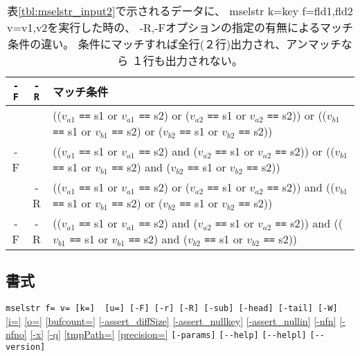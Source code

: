 \begin{table}[htbp]
\begin{center}
\caption{表\ref{tbl:mselstr_input2}で示されるデータに、
mselstr k=key f=fld1,fld2 v=v1,v2を実行した時の、
-R,-Fオプションの指定の有無によるマッチ条件の違い。
条件にマッチすれば全行(２行)出力され、アンマッチなら
１行も出力されない。\label{tbl:mselstr_cond}}
{\footnotesize
\begin{tabular}{ccl}
\hline
\verb|-F| & \verb|-R| & マッチ条件 \\
\hline
   &    &
(($v_{a1}$ \verb|==| s1 or $v_{a1}$ \verb|==| s2)  or
 ($v_{a2}$ \verb|==| s1 or $v_{a2}$ \verb|==| s2)) or
(($v_{b1}$ \verb|==| s1 or $v_{b1}$ \verb|==| s2)  or
 ($v_{b2}$ \verb|==| s1 or $v_{b2}$ \verb|==| s2)) \\
-F &    &
(($v_{a1}$ \verb|==| s1 or $v_{a1}$ \verb|==| s2)  and
 ($v_{a2}$ \verb|==| s1 or $v_{a2}$ \verb|==| s2)) or
(($v_{b1}$ \verb|==| s1 or $v_{b1}$ \verb|==| s2)  and
 ($v_{b2}$ \verb|==| s1 or $v_{b2}$ \verb|==| s2)) \\
   & -R & 
(($v_{a1}$ \verb|==| s1 or $v_{a1}$ \verb|==| s2)  or
 ($v_{a2}$ \verb|==| s1 or $v_{a2}$ \verb|==| s2)) and
(($v_{b1}$ \verb|==| s1 or $v_{b1}$ \verb|==| s2)  or
 ($v_{b2}$ \verb|==| s1 or $v_{b2}$ \verb|==| s2)) \\
-F & -R & 
(($v_{a1}$ \verb|==| s1 or $v_{a1}$ \verb|==| s2)  and
 ($v_{a2}$ \verb|==| s1 or $v_{a2}$ \verb|==| s2)) and
(($v_{b1}$ \verb|==| s1 or $v_{b1}$ \verb|==| s2)  and
 ($v_{b2}$ \verb|==| s1 or $v_{b2}$ \verb|==| s2)) \\
\hline
\end{tabular}
}

\end{center}
\end{table}

\subsection*{書式}
\verb|mselstr f= v= [k=]  [u=] [-F] [-r] [-R] [-sub] [-head] [-tail] [-W]|
\hyperref[sect:option_i]{[i=]}
\hyperref[sect:option_o]{[o=]}
\hyperref[sect:option_bufcount]{[bufcount=]} 
\hyperref[sect:option_assert_diffSize]{[-assert\_diffSize]}
\hyperref[sect:option_assert_nullkey]{[-assert\_nullkey]}
\hyperref[sect:option_assert_nullin]{[-assert\_nullin]}
\hyperref[sect:option_nfn]{[-nfn]} 
\hyperref[sect:option_nfno]{[-nfno]}  
\hyperref[sect:option_x]{[-x]}
\hyperref[sect:option_q]{[-q]}
\hyperref[sect:option_option_tmppath]{[tmpPath=]}
\hyperref[sect:option_precision]{[precision=]}
\verb|[-params]|
\verb|[--help]|
\verb|[--helpl]|
\verb|[--version]|\\

